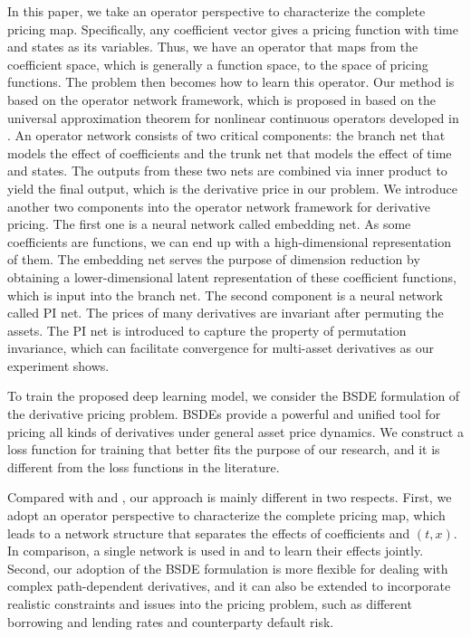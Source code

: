 \documentclass[11pt,a4paper]{article}
\theoremstyle{remark}
\begin{document}
	In this paper, we take an operator perspective to characterize the complete pricing map. Specifically, any coefficient vector gives a pricing function with time and states as its variables. Thus, we have an operator that maps from the coefficient space, which is generally a function space, to the space of pricing functions. The problem then becomes how to learn this operator. Our method is based on the operator network framework, which is proposed in \cite{lu2021learning} based on the universal approximation theorem for nonlinear continuous operators developed in \cite{chen1995universal}. An operator network consists of two critical components: the branch net that models the effect of coefficients and the trunk net that models the effect of time and states. The outputs from these two nets are combined via inner product to yield the final output, which is the derivative price in our problem. We introduce another two components into the operator network framework for derivative pricing. The first one is a neural network called embedding net. As some coefficients are functions, we can end up with a high-dimensional representation of them. The embedding net serves the purpose of dimension reduction by obtaining a lower-dimensional latent representation of these coefficient functions, which is input into the branch net. The second component is a neural network called PI net. The prices of many derivatives are invariant after permuting the assets. The PI net is introduced to capture the property of permutation invariance, which can facilitate convergence for multi-asset derivatives as our experiment shows. 
	
	To train the proposed deep learning model, we consider the BSDE formulation of the derivative pricing problem. BSDEs provide a powerful and unified tool for pricing all kinds of derivatives under general asset price dynamics. We construct a loss function for training that better fits the purpose of our research, and it is different from the loss functions in the literature.
	
	Compared with \cite{berner2020numerically} and \cite{glau2022deep},  our approach is mainly different in two respects. First, we adopt an operator perspective to characterize the complete pricing map, which leads to a network structure that separates the effects of coefficients and $(t,x)$. In comparison, a single network is used in \cite{berner2020numerically} and \cite{glau2022deep} to learn their effects jointly. Second, our adoption of the BSDE formulation is more flexible for dealing with complex path-dependent derivatives, and it can also be extended to incorporate realistic constraints and issues into the pricing problem, such as different borrowing and lending rates and counterparty default risk. 
	
\end{document}
